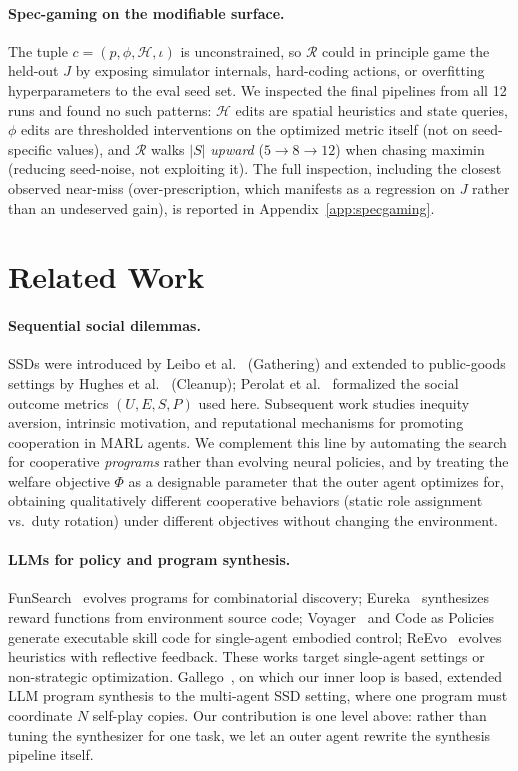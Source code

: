 \documentclass{article}
\newcommand{\cR}{\mathcal{R}}
\begin{document}
\paragraph{Spec-gaming on the modifiable surface.}
The tuple $c=(p,\phi,\mathcal{H},\iota)$ is unconstrained, so $\cR$ could in principle game the held-out $J$ by exposing simulator internals, hard-coding actions, or overfitting hyperparameters to the eval seed set. We inspected the final pipelines from all 12 runs and found no such patterns: $\mathcal{H}$ edits are spatial heuristics and state queries, $\phi$ edits are thresholded interventions on the optimized metric itself (not on seed-specific values), and $\cR$ walks $|S|$ \emph{upward} ($5{\to}8{\to}12$) when chasing maximin (reducing seed-noise, not exploiting it). The full inspection, including the closest observed near-miss (over-prescription, which manifests as a regression on $J$ rather than an undeserved gain), is reported in Appendix~\ref{app:specgaming}.

\section{Related Work}

\paragraph{Sequential social dilemmas.}
SSDs were introduced by Leibo et al.~\cite{leibo2017} (Gathering) and extended to public-goods settings by Hughes et al.~\cite{hughes2018} (Cleanup); Perolat et al.~\cite{perolat2017} formalized the social outcome metrics $(U, E, S, P)$ used here. Subsequent work studies inequity aversion, intrinsic motivation, and reputational mechanisms for promoting cooperation in MARL agents. We complement this line by automating the search for cooperative \emph{programs} rather than evolving neural policies, and by treating the welfare objective $\Phi$ as a designable parameter that the outer agent optimizes for, obtaining qualitatively different cooperative behaviors (static role assignment vs.\ duty rotation) under different objectives without changing the environment.

\paragraph{LLMs for policy and program synthesis.}
FunSearch~\cite{romera2024} evolves programs for combinatorial discovery; Eureka~\cite{ma2024} synthesizes reward functions from environment source code; Voyager~\cite{wang2024} and Code as Policies~\cite{liang2023} generate executable skill code for single-agent embodied control; ReEvo~\cite{ye2024} evolves heuristics with reflective feedback. These works target single-agent settings or non-strategic optimization. Gallego~\cite{gallego2026}, on which our inner loop is based, extended LLM program synthesis to the multi-agent SSD setting, where one program must coordinate $N$ self-play copies. Our contribution is one level above: rather than tuning the synthesizer for one task, we let an outer agent rewrite the synthesis pipeline itself.
\end{document}
